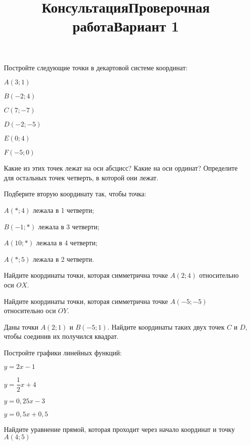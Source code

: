 \newpage
\title{Консультация}
\begin{listofex}
	\item Постройте следующие точки в декартовой системе координат:
	\begin{enumcols}[itemcolumns=3]
		\item \( A(3;1) \)
		\item \( B(-2;4) \)
		\item \( C(7;-7) \)
		\item \( D(-2;-5) \)
		\item \( E(0;4) \)
		\item \( F(-5;0) \)
	\end{enumcols}
	Какие из этих точек лежат на оси абсцисс? Какие на оси ординат? Определите для остальных точек четверть, в которой они лежат.
	\item Подберите вторую координату так, чтобы точка:
	\begin{enumcols}[itemcolumns=1]
		\item \( A(*;4) \) лежала в 1 четверти;
		\item \( B(-1;*) \) лежала в 3 четверти;
		\item \( A(10;*) \) лежала в 4 четверти;
		\item \( A(*;5) \) лежала в 2 четверти.
	\end{enumcols}
	\item Найдите координаты точки, которая симметрична точке \( A(2;4) \) относительно оси \( OX \).
	\item Найдите координаты точки, которая симметрична точке \( A(-5;-5) \) относительно оси \( OY \).
	\item Даны точки \( A(2;1) \) и \( B(-5;1) \). Найдите координаты таких двух точек \( C \) и \( D \), чтобы соединив их получился квадрат.
	\item Постройте графики линейных функций:
	\begin{enumcols}[itemcolumns=2]
		\item \( y=2x-1 \)
		\item \( y=\dfrac{1}{2}x+4 \)
		\item \( y=0,25x-3 \)
		\item \( y=0,5x+0,5 \)
	\end{enumcols}
	\item Найдите уравнение прямой, которая проходит через начало координат и точку \( A(4;5) \)
\end{listofex}
\newpage
\newpage
\title{Проверочная работа}
\title{Вариант 1}
